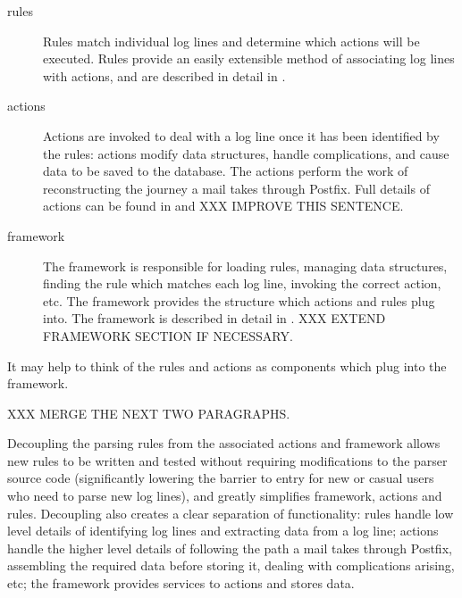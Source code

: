 \begin{description}

    \item [rules] Rules match individual log lines and determine which
        actions will be executed.  Rules provide an easily extensible
        method of associating log lines with actions, and are described in
        detail in .

    \item [actions] Actions are invoked to deal with a log line once it has
        been identified by the rules: actions modify data structures,
        handle complications, and cause data to be saved to the database.
        The actions perform the work of reconstructing the journey a mail
        takes through Postfix.  Full details of actions can be found in
         and 
        XXX IMPROVE THIS SENTENCE\@.

    \item [framework] The framework is responsible for loading rules,
        managing data structures, finding the rule which matches each log
        line, invoking the correct action, etc.  The framework provides the
        structure which actions and rules plug into.  The framework is
        described in detail in .  XXX EXTEND
        FRAMEWORK SECTION IF NECESSARY\@.

\end{description}

It may help to think of the rules and actions as components which plug into
the framework.  

\label{why separate rules, actions and framework?}

XXX MERGE THE NEXT TWO PARAGRAPHS\@.

Decoupling the parsing rules from the associated actions and framework
allows new rules to be written and tested without requiring modifications
to the parser source code (significantly lowering the barrier to entry for
new or casual users who need to parse new log lines), and greatly
simplifies framework, actions and rules.  Decoupling also creates a clear
separation of functionality: rules handle low level details of identifying
log lines and extracting data from a log line; actions handle
the higher level details of following the path a mail takes through
Postfix, assembling the required data before storing it, dealing with
complications arising, etc; the framework provides services to actions and
stores data.

